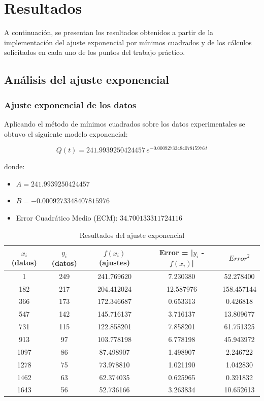 \chapter{Resultados}

A continuación, se presentan los resultados obtenidos a partir de la implementación del ajuste exponencial por mínimos cuadrados y de los cálculos solicitados en cada uno de los puntos del trabajo práctico. 

\section{Análisis del ajuste exponencial}

\subsection{Ajuste exponencial de los datos}

Aplicando el método de mínimos cuadrados sobre los datos experimentales se obtuvo el siguiente modelo exponencial:

\[
Q(t)=241.9939250424457\,e^{-0.0009273348407815976\,t}
\]

donde:

\begin{itemize}
    \item $A=241.9939250424457$
    \item $B=-0.0009273348407815976$
    \item Error Cuadrático Medio (ECM): $34.700133311724116$
\end{itemize}
\begin{table}[ht]
\centering
\caption{Resultados del ajuste exponencial}
\label{tab:ajuste_exponencial}

\begin{tabular}{ccccc}
\toprule
$x_i$ (datos) & $y_i$ (datos) & $f(x_i)$ (ajustes) & Error = |$y_i$ - $f(x_i)$| & $Error^2$ \\
\midrule
1 & 249 & 241.769620 & 7.230380 & 52.278400 \\
182 & 217 & 204.412024 & 12.587976 & 158.457144 \\
366 & 173 & 172.346687 & 0.653313 & 0.426818 \\
547 & 142 & 145.716137 & 3.716137 & 13.809677 \\
731 & 115 & 122.858201 & 7.858201 & 61.751325 \\
913 & 97 & 103.778198 & 6.778198 & 45.943972 \\
1097 & 86 & 87.498907 & 1.498907 & 2.246722 \\
1278 & 75 & 73.978810 & 1.021190 & 1.042830 \\
1462 & 63 & 62.374035 & 0.625965 & 0.391832 \\
1643 & 56 & 52.736166 & 3.263834 & 10.652613 \\
\bottomrule
\end{tabular}
\end{table}


